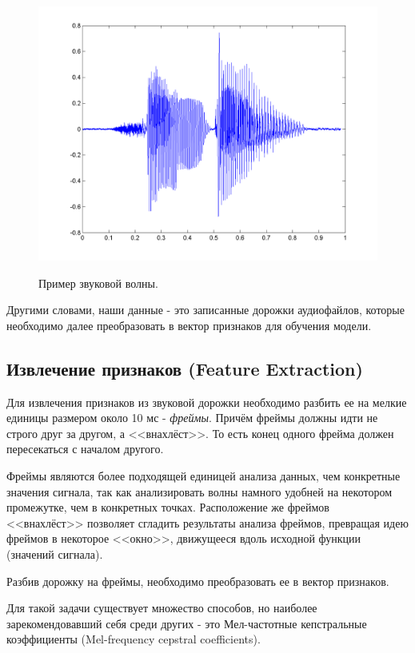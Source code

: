 \documentclass[a4paper,14pt]{extarticle}
\begin{document}
 	\begin{figure}[h!]
 		\begin{center}
 			{\includegraphics[scale = 0.35]{img/wave.png}}
 			\label{ris:wave}
 		\end{center}
 		\caption{Пример звуковой волны.}
 	\end{figure}
 
 	Другими словами, наши данные - это записанные дорожки аудиофайлов, которые необходимо далее преобразовать в вектор признаков для обучения модели.
 
 	\subsection{Извлечение признаков (Feature Extraction)}
 	
 	Для извлечения признаков из звуковой дорожки необходимо разбить ее на мелкие единицы размером около 10 мс - \textit{фреймы}. Причём фреймы должны идти не строго друг за другом, а <<внахлёст>>. То есть конец одного фрейма должен пересекаться с началом другого.
 	
 	Фреймы являются более подходящей единицей анализа данных, чем конкретные значения сигнала, так как анализировать волны намного удобней на некотором промежутке, чем в конкретных точках. Расположение же фреймов <<внахлёст>> позволяет сгладить результаты анализа фреймов, превращая идею фреймов в некоторое <<окно>>, движущееся вдоль исходной функции (значений сигнала).
 	
 	Разбив дорожку на фреймы, необходимо преобразовать ее в вектор признаков.
 
 	Для такой задачи существует множество способов, но наиболее зарекомендовавший себя среди других - это Мел-частотные кепстральные коэффициенты (Mel-frequency cepstral coefficients).
 	
\end{document}
